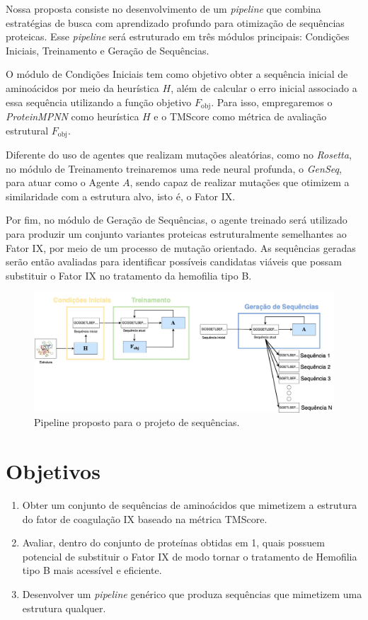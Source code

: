 Nossa proposta consiste no desenvolvimento de um \textit{pipeline} que combina estratégias de busca 
com aprendizado profundo para otimização de sequências proteicas. 
Esse \textit{pipeline} será estruturado em três módulos principais: Condições Iniciais, 
Treinamento e Geração de Sequências.






O módulo de Condições Iniciais tem como objetivo obter a sequência inicial de aminoácidos 
por meio da heurística \( H \), além de calcular o erro inicial associado a essa sequência 
utilizando a função objetivo \( F_{\text{obj}} \). 
Para isso, empregaremos o \textit{ProteinMPNN} como heurística \( H \) 
e o TMScore como métrica de avaliação estrutural \( F_{\text{obj}} \).  

Diferente do uso de agentes que realizam mutações aleatórias, como no \textit{Rosetta},
no módulo de Treinamento treinaremos uma rede neural profunda, o \textit{GenSeq}, para atuar como o Agente $A$,
sendo capaz de realizar mutações que otimizem a similaridade com a estrutura alvo, isto é, o Fator IX.

Por fim, no módulo de Geração de Sequências, 
o agente treinado será utilizado para produzir um conjunto variantes proteicas estruturalmente semelhantes ao Fator IX,
por meio de um processo de mutação orientado. 
As sequências geradas serão então avaliadas para identificar possíveis candidatas viáveis 
que possam substituir o Fator IX no tratamento da hemofilia tipo B.



\begin{figure}[H]
  \centering
  \includegraphics[width=.8\textwidth]{figuras/metodologia-pipeline_proposta.jpg}
  \caption{Pipeline proposto para o projeto de sequências.}
  \label{fig:proposta}
\end{figure}

\section{Objetivos}

\begin{enumerate}
  \item Obter um conjunto de sequências de aminoácidos que mimetizem a estrutura do fator de coagulação IX baseado na métrica TMScore.
  \item Avaliar, dentro do conjunto de proteínas obtidas em 1, quais possuem potencial de substituir o Fator IX de modo tornar o tratamento de Hemofilia tipo B mais acessível e eficiente.
  \item Desenvolver um \textit{pipeline} genérico que produza sequências que mimetizem uma estrutura qualquer.
\end{enumerate}

